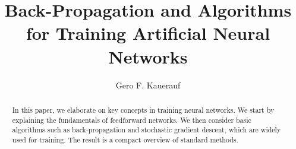 \documentclass[runningheads]{llncs}
\numberwithin{equation}{subsection} %
\numberwithin{figure}{section}
\begin{document}
%
\title{Back-Propagation and Algorithms for Training Artificial Neural Networks}
%
%
\author{Gero F. Kauerauf}
%
%
%
\maketitle              %
%
\begin{abstract}
    In this paper, we elaborate on key concepts in training neural networks.
    We start by explaining the fundamentals of feedforward networks.
    We then consider basic algorithms such as back-propagation and stochastic gradient descent, which are widely used for training.
    The result is a compact overview of standard methods.
\end{abstract}
%
%
%























%
%
%


\end{document}
